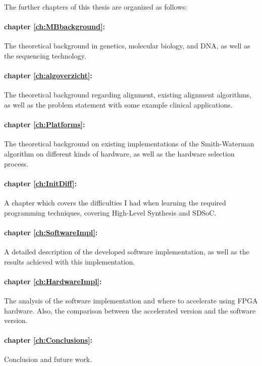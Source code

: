 The further chapters of this thesis are organized as follows:

\paragraph{chapter \ref{ch:MBbackground}:} The theoretical background in genetics, molecular biology, and DNA, as well as the sequencing technology.
\paragraph{chapter \ref{ch:algoverzicht}:} The theoretical background regarding alignment, existing alignment algorithms, as well as the problem statement with some example clinical applications.
\paragraph{chapter \ref{ch:Platforms}:} The theoretical background on existing implementations of the Smith-Waterman algorithm on different kinds of hardware, as well as the hardware selection process.
\paragraph{chapter \ref{ch:InitDiff}:} A chapter which covers the difficulties I had when learning the required programming techniques, covering High-Level Synthesis and SDSoC. 
\paragraph{chapter \ref{ch:SoftwareImpl}:} A detailed description of the developed software implementation, as well as the results achieved with this implementation.
\paragraph{chapter \ref{ch:HardwareImpl}:} The analysis of the software implementation and where to accelerate using FPGA hardware. Also, the comparison between the accelerated version and the software version.
\paragraph{chapter \ref{ch:Conclusions}:} Conclusion and future work.